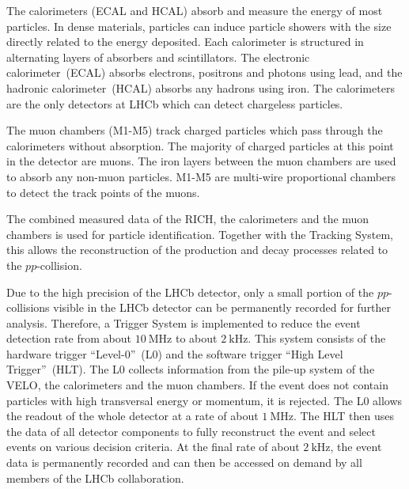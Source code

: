 The calorimeters (ECAL and HCAL) absorb and measure the energy of most particles.
In dense materials, particles can induce particle showers with the size directly related to the energy deposited.
Each calorimeter is structured in alternating layers of absorbers and scintillators. 
The electronic calorimeter~(ECAL) absorbs electrons, positrons and photons using lead, and the hadronic calorimeter~(HCAL) absorbs any hadrons using iron.
The calorimeters are the only detectors at LHCb which can detect chargeless particles.

The muon chambers (M1-M5) track charged particles which pass through the calorimeters without absorption.
The majority of charged particles at this point in the detector are muons.
The iron layers between the muon chambers are used to absorb any non-muon particles.
M1-M5 are multi-wire proportional chambers to detect the track points of the muons.

The combined measured data of the RICH, the calorimeters and the muon chambers is used for particle identification.
Together with the Tracking System, this allows the reconstruction of the production and decay processes related to the $pp$-collision.

Due to the high precision of the LHCb detector, only a small portion of the $pp$-collisions visible in the LHCb detector can be permanently recorded for further analysis.
Therefore, a Trigger System is implemented to reduce the event detection rate from about $\qty{10}{\MHz}$ to about $\qty{2}{\kHz}$.
This system consists of the hardware trigger \enquote{Level-0}~(L0) and the software trigger \enquote{High Level Trigger}~(HLT).
The L0 collects information from the pile-up system of the VELO, the calorimeters and the muon chambers.
If the event does not contain particles with high transversal energy or momentum, it is rejected.
The L0 allows the readout of the whole detector at a rate of about $\qty{1}{\MHz}$.
The HLT then uses the data of all detector components to fully reconstruct the event and select events on various decision criteria.
At the final rate of about $\qty{2}{\kHz}$, the event data is permanently recorded and can then be accessed on demand by all members of the LHCb collaboration.
